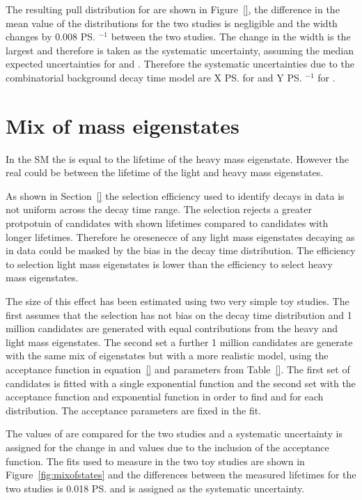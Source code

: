 {{The resulting pull distribution for \Gmumu are shown in Figure~\ref{}, the difference in the mean value of the distributions for the two studies is negligible and the width changes by 0.008 \ps$^{-1}$ between the two studies. The change in the width is the largest and therefore is taken as the systematic uncertainty, assuming the median expected uncertainties for \Gmumu and \tmumu. Therefore the systematic uncertainties due to the combinatorial background decay time model are X \ps for \tmumu and Y \ps$^{-1}$ for \Gmumu.

\section{Mix of \bs mass eigenstates}
\label{sec:mixofeigenstates}

In the SM the \bsmumu \el is equal to the lifetime of the heavy \bs mass eigenstate. However the real \bsmumu \el could be between the lifetime of the light and heavy mass eigenstates. %

As shown in Section~\ref{} the selection efficiency used to identify \bsmumu decays in data is not uniform across the decay time range. The selection rejects a greater protpotuin of candidates with shown lifetimes compared to candidates with longer lifetimes. Therefore he oresenecce of any \bs light mass eigenstates decaying as \bsmumu in data could be masked by the bias in the decay time distribution. The efficiency to selection light \bs mass eigenstates is lower than the efficiency to select heavy \bs mass eigenstates.

The size of this effect has been estimated using two very simple toy studies. The first assumes that the selection has not bias on the decay time distribution and 1 million candidates are generated with equal contributions from the heavy and light \bs mass eigenstates.%
The second set a further 1 million candidates are generate with the same mix of eigenstates but with a more realistic model, using the acceptance function in equation~\ref{} and parameters from Table~\ref{}. The first set of candidates is fitted with a single exponential function and the second set with the acceptance function and exponential function in order to find \tmumu and \Gmumu for each distribution. The acceptance parameters are fixed in the fit.

The values of \tmumu are compared for the two studies and a systematic uncertainty is assigned for the change in \tmumu and values due to the inclusion of the acceptance function. The \ml fits used to measure \tmumu in the two toy studies are shown in Figure~\ref{fig:mixofstates} and the differences between the measured lifetimes for the two studies is 0.018 \ps and is assigned as the systematic uncertainty.

}}
